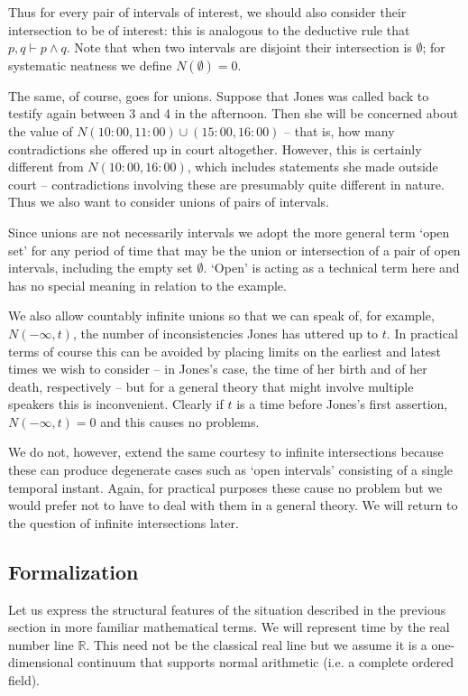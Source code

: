 \documentclass[oneside,english]{article}
\theoremstyle{plain}
\theoremstyle{definition}
\theoremstyle{definition}
\begin{document}
Thus for every pair of intervals of interest, we should also consider their intersection to be of interest: this is analogous to the deductive rule that $p, q\vdash p\land q$. Note that when two intervals are disjoint their intersection is $\emptyset$; for systematic neatness we define $N(\emptyset) = 0$.

The same, of course, goes for unions. Suppose that Jones was called back to testify again between 3 and 4 in the afternoon. Then she will be concerned about the value of $N(10:00, 11:00)\cup(15:00, 16:00)$ -- that is, how many contradictions she offered up in court altogether. However, this is certainly different from $N(10:00, 16:00)$, which includes statements she made outside court -- contradictions involving these are presumably quite different in nature. Thus we also want to consider unions of pairs of intervals. 

Since unions are not necessarily intervals we adopt the more general term `open set' for any period of time that may be the union or intersection of a pair of open intervals, including the empty set $\emptyset$. `Open' is acting as a technical term here and has no special meaning in relation to the example.

We also allow countably infinite unions so that we can speak of, for example, $N(-\infty, t)$, the number of inconsistencies Jones has uttered up to $t$. In practical terms of course this can be avoided by placing limits on the earliest and latest times we wish to consider -- in Jones's case, the time of her birth and of her death, respectively -- but for a general theory that might involve multiple speakers this is inconvenient. Clearly if $t$ is a time before Jones's first assertion, $N(-\infty, t) = 0$ and this causes no problems.

We do not, however, extend the same courtesy to infinite intersections because these can produce degenerate cases such as `open intervals' consisting of a single temporal instant. Again, for practical purposes these cause no problem but we would prefer not to have to deal with them in a general theory. We will return to the question of infinite intersections later.

\subsection{Formalization}

Let us express the structural features of the situation described in the previous section in more familiar mathematical terms. We will represent time by the real number line $\mathbb{R}$. This need not be the classical real line but we assume it is a one-dimensional continuum that supports normal arithmetic (i.e. a complete ordered field). 
\end{document}
